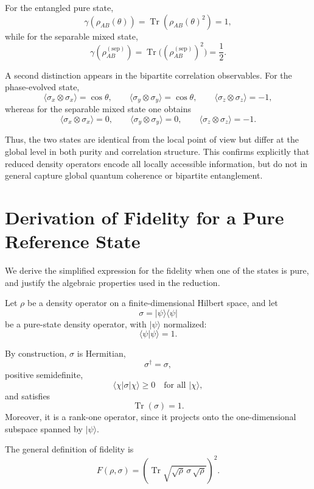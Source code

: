 \documentclass[a4paper]{article}
\begin{document}
For the entangled pure state,
\[
\gamma(\rho_{AB}(\theta)) = \operatorname{Tr}(\rho_{AB}(\theta)^2) = 1,
\]
while for the separable mixed state,
\[
\gamma(\rho_{AB}^{(\mathrm{sep})}) = \operatorname{Tr}\big((\rho_{AB}^{(\mathrm{sep})})^2\big) = \frac{1}{2}.
\]

A second distinction appears in the bipartite correlation observables. For the phase-evolved state,
\[
\langle \sigma_x \otimes \sigma_x \rangle = \cos\theta, \qquad
\langle \sigma_y \otimes \sigma_y \rangle = \cos\theta, \qquad
\langle \sigma_z \otimes \sigma_z \rangle = -1,
\]
whereas for the separable mixed state one obtains
\[
\langle \sigma_x \otimes \sigma_x \rangle = 0, \qquad
\langle \sigma_y \otimes \sigma_y \rangle = 0, \qquad
\langle \sigma_z \otimes \sigma_z \rangle = -1.
\]

Thus, the two states are identical from the local point of view but differ at the global level in both purity and correlation structure. This confirms explicitly that reduced density operators encode all locally accessible information, but do not in general capture global quantum coherence or bipartite entanglement.

\section{Derivation of Fidelity for a Pure Reference State}

We derive the simplified expression for the fidelity when one of the states is pure, and justify the algebraic properties used in the reduction.

\medskip

Let $\rho$ be a density operator on a finite-dimensional Hilbert space, and let
\[
\sigma = |\psi\rangle\langle\psi|
\]
be a pure-state density operator, with $|\psi\rangle$ normalized:
\[
\langle \psi | \psi \rangle = 1.
\]

By construction, $\sigma$ is Hermitian,
\[
\sigma^\dagger = \sigma,
\]
positive semidefinite,
\[
\langle \chi | \sigma | \chi \rangle \ge 0
\quad \text{for all } |\chi\rangle,
\]
and satisfies
\[
\operatorname{Tr}(\sigma) = 1.
\]
Moreover, it is a rank-one operator, since it projects onto the one-dimensional subspace spanned by $|\psi\rangle$.

\medskip

The general definition of fidelity is
\[
F(\rho,\sigma)
=
\left(\operatorname{Tr}\sqrt{\sqrt{\rho}\,\sigma\,\sqrt{\rho}}\right)^2.
\]
\end{document}
